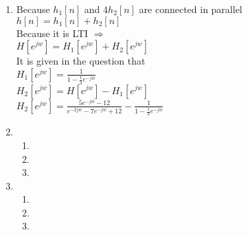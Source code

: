 \documentclass[10pt,a4paper, margin=1in]{article}
\begin{document}
\begin{enumerate}
\item %
	Because $h_{1}[n]$ and $4h_2[n]$ are connected in parallel  \\
	
    $h[n]=h_{1}[n] + h_2[n] $ \\
    Because it is LTI
    $\Rightarrow $\\
    $H[e^{jw}]=H_{1}[e^{jw}] + H_2[e^{jw}]  $ \\
    $ $ \\ It is given in the question that
    $ $ \\
    $H_{1}[e^{jw}]=\frac{1}{1-\frac{1}{3}e^{-jw}}  $ \\
	$H_{2}[e^{jw}]= H[e^{jw}]- H_{1}[e^{jw}]$ \\
    $H_{2}[e^{jw}]= \frac{5e^{-jw}-12}{e^{-2jw}-7e^{-jw}+12}- \frac{1}{1-\frac{1}{3}e^{-jw}} $ \\
	$ $ \\
    $ $ \\
	$ $ \\
    $ $ \\    

\item %
    \begin{enumerate}
    \item %
    \item %
    \item %
    \end{enumerate}
\item %
    \begin{enumerate}
    \item %
    \item %
    \item %
    \end{enumerate}
    
\end{enumerate}
\end{document}
